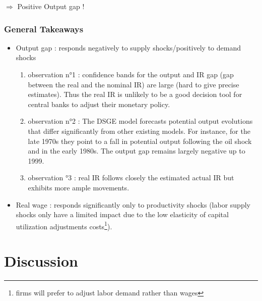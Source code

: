 \documentclass{article}
\begin{document}
$\Longrightarrow$ Positive Output gap !

\subsubsection{General Takeaways}
\begin{itemize}
    \item Output gap :  responds negatively to supply shocks/positively to demand shocks
    \begin{enumerate}
        \item observation n°1 : confidence bands for the output and IR gap (gap between the real and the nominal IR) are large (hard to give precise estimates). Thus the real IR is unlikely to be a good decision tool for central banks to adjust their monetary policy. 
        \item observation n°2 : The DSGE model forecasts potential output evolutions that differ significantly from other existing models. For instance, for the late 1970s they point to a fall in potential output following the oil shock and in the early 1980s. The output gap remains largely negative up to 1999. 
        \item observation °3 : real IR follows closely the estimated actual IR but exhibits more ample movements. 
    \end{enumerate}
    \item Real wage : responds significantly only to productivity shocks (labor supply shocks only have a limited impact due to the low elasticity of capital utilization adjustments costs\footnote{firms will prefer to adjust labor demand rather than wages}). 
\end{itemize}





\section{Discussion}
\end{document}
